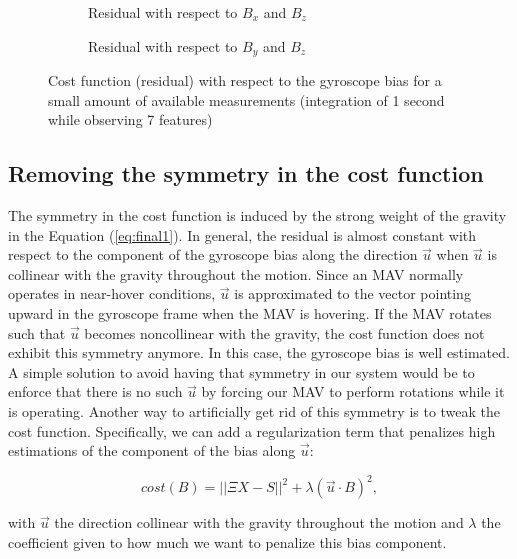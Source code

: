 \documentclass[letterpaper, 10pt, conference, final]{ieeeconf}  %
\begin{document}
\begin{figure}
        \centering
        \begin{subfigure}[b]{0.7\columnwidth}
                \resizebox{\columnwidth}{!}{}
                \caption{Residual with respect to $B_x$ and $B_z$}
        \end{subfigure}

        \begin{subfigure}[b]{0.7\columnwidth}
                \resizebox{\columnwidth}{!}{}
                \caption{Residual with respect to $B_y$ and $B_z$}
        \end{subfigure}
        \caption{Cost function (residual) with respect to the gyroscope bias for a small amount of available measurements (integration of 1 second while observing 7 features)\label{fig:cost}}
\end{figure}

\subsection{Removing the symmetry in the cost function \label{sec:symmetry}}

The symmetry in the cost function is induced by the strong weight of the gravity in the Equation (\ref{eq:final1}).
In general, the residual is almost constant with respect to the component of the gyroscope bias along the direction $\vec{u}$ when $\vec{u}$ is collinear with the gravity throughout the motion.
Since an MAV normally operates in near-hover conditions, $\vec{u}$ is approximated to the vector pointing upward in the gyroscope frame when the MAV is hovering.
If the MAV rotates such that $\vec{u}$ becomes noncollinear with the gravity, the cost function does not exhibit this symmetry anymore.
In this case, the gyroscope bias is well estimated.
A simple solution to avoid having that symmetry in our system would be to enforce that there is no such $\vec{u}$ by forcing our MAV to perform rotations while it is operating.
Another way to artificially get rid of this symmetry is to tweak the cost function.
Specifically, we can add a regularization term that penalizes high estimations of the component of the bias along $\vec{u}$:

\begin{equation}
cost(B) = ||\Xi X - S||^2 + \lambda (\vec{u} \cdot B)^2,
\end{equation}


\noindent with $\vec{u}$ the direction collinear with the gravity throughout the motion and  $\lambda$ the coefficient given to how much we want to penalize this bias component.
\end{document}
